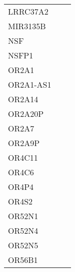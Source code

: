 \begin{tabular}{lcc}
LRRC37A2     &                &            \\
MIR3135B     &                &            \\
NSF          &                &            \\
NSFP1        &                &            \\
OR2A1        &                &            \\
OR2A1-AS1    &                &            \\
OR2A14       &                &            \\
OR2A20P      &                &            \\
OR2A7        &                &            \\
OR2A9P       &                &            \\
OR4C11       &                &            \\
OR4C6        &                &            \\
OR4P4        &                &            \\
OR4S2        &                &            \\
OR52N1       &                &            \\
OR52N4       &                &            \\
OR52N5       &                &            \\
OR56B1       &                &            \\
\bottomrule
\end{tabular}
